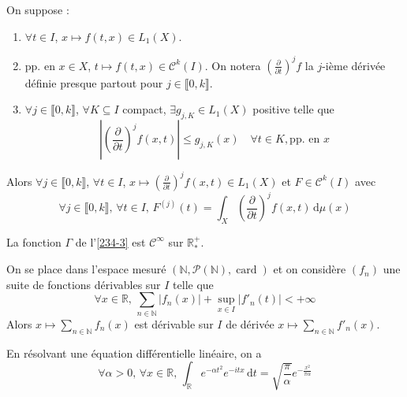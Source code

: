   \begin{theorem}
    On suppose :
    \begin{enumerate}[label=(\roman*)]
      \item $\forall t \in I$, $x \mapsto f(t,x) \in L_1(X)$.
      \item pp. en $x \in X$, $t \mapsto f(t,x) \in \mathcal{C}^k(I)$. On notera $\left(\frac{\partial}{\partial t}\right)^j f$ la $j$-ième dérivée définie presque partout pour $j \in \llbracket 0, k \rrbracket$.
      \item $\forall j \in \llbracket 0, k \rrbracket$, $\forall K \subseteq I$ compact, $\exists g_{j,K} \in L_1(X)$ positive telle que
      \[ \left| \left(\frac{\partial}{\partial t}\right)^j f(x,t) \right| \leq g_{j,K}(x) \quad \forall t \in K, \text{pp. en } x \]
    \end{enumerate}
    Alors $\forall j \in \llbracket 0, k \rrbracket$, $\forall t \in I$, $x \mapsto \left(\frac{\partial}{\partial t}\right)^j f(x,t) \in L_1(X)$ et $F \in \mathcal{C}^k(I)$ avec
    \[ \forall j \in \llbracket 0, k \rrbracket, \, \forall t \in I, \, F^{(j)}(t) = \int_X \left(\frac{\partial}{\partial t}\right)^j f(x, t) \, \mathrm{d}\mu(x) \]
  \end{theorem}


  \begin{example}
    La fonction $\Gamma$ de l'\cref{234-3} est $\mathcal{C}^\infty$ sur $\mathbb{R}^+_*$.
  \end{example}


  \begin{example}
    On se place dans l'espace mesuré $(\mathbb{N}, \mathcal{P}(\mathbb{N}), \operatorname{card})$ et on considère $(f_n)$ une suite de fonctions dérivables sur $I$ telle que
    \[ \forall x \in \mathbb{R}, \, \sum_{n \in \mathbb{N}} |f_n(x)| + \sup_{x \in I} |f'_n(t)| < +\infty \]
    Alors $x \mapsto \sum_{n \in \mathbb{N}} f_n(x)$ est dérivable sur $I$ de dérivée $x \mapsto \sum_{n \in \mathbb{N}} f'_n(x)$.
  \end{example}


  \begin{application}
    En résolvant une équation différentielle linéaire, on a
    \[ \forall \alpha > 0, \, \forall x \in \mathbb{R}, \, \int_{\mathbb{R}} e^{-\alpha t^2} e^{-itx} \, \mathrm{d}t = \sqrt{\frac{\pi}{\alpha}} e^{-\frac{x^2}{\pi \alpha}} \]
  \end{application}

